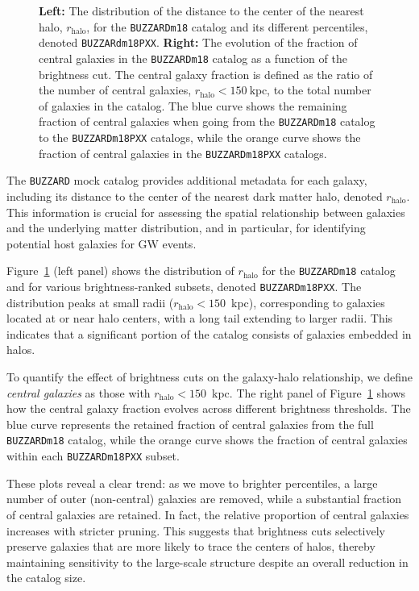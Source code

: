 \begin{figure}[h!]
\begin{subfigure}{0.45\textwidth}
    \end{subfigure}
    \caption[$r_{\mathrm{halo}}$ distribution and evolution for \texttt{BUZZARDm18} and its percentiles.]{\textbf{Left:} The distribution of the distance to the center of the nearest halo, $r_{\mathrm{halo}}$, for the \texttt{BUZZARDm18} catalog and its different percentiles, denoted \texttt{BUZZARdm18PXX}. \textbf{Right:} The evolution of the fraction of central galaxies in the \texttt{BUZZARDm18} catalog as a function of the brightness cut. The central galaxy fraction is defined as the ratio of the number of central galaxies, $r_{\mathrm{halo}} < 150~\mathrm{kpc}$, to the total number of galaxies in the catalog. The blue curve shows the remaining fraction of central galaxies when going from the \texttt{BUZZARDm18} catalog to the \texttt{BUZZARDm18PXX} catalogs, while the orange curve shows the fraction of central galaxies in the \texttt{BUZZARDm18PXX} catalogs.}
    \label{fig:MDC_rhalo}
\end{figure}

The \texttt{BUZZARD} mock catalog provides additional metadata for each galaxy, including its distance to the center of the nearest dark matter halo, denoted $r_{\mathrm{halo}}$. This information is crucial for assessing the spatial relationship between galaxies and the underlying matter distribution, and in particular, for identifying potential host galaxies for \ac{GW} events.

Figure~\ref{fig:MDC_rhalo} (left panel) shows the distribution of $r_{\mathrm{halo}}$ for the \texttt{BUZZARDm18} catalog and for various brightness-ranked subsets, denoted \texttt{BUZZARDm18PXX}. The distribution peaks at small radii ($r_{\mathrm{halo}} < 150$~kpc), corresponding to galaxies located at or near halo centers, with a long tail extending to larger radii. This indicates that a significant portion of the catalog consists of galaxies embedded in halos.

To quantify the effect of brightness cuts on the galaxy-halo relationship, we define \textit{central galaxies} as those with $r_{\mathrm{halo}} < 150$~kpc. The right panel of Figure~\ref{fig:MDC_rhalo} shows how the central galaxy fraction evolves across different brightness thresholds. The blue curve represents the retained fraction of central galaxies from the full \texttt{BUZZARDm18} catalog, while the orange curve shows the fraction of central galaxies within each \texttt{BUZZARDm18PXX} subset.

These plots reveal a clear trend: as we move to brighter percentiles, a large number of outer (non-central) galaxies are removed, while a substantial fraction of central galaxies are retained. In fact, the relative proportion of central galaxies increases with stricter pruning. This suggests that brightness cuts selectively preserve galaxies that are more likely to trace the centers of halos, thereby maintaining sensitivity to the large-scale structure despite an overall reduction in the catalog size.

